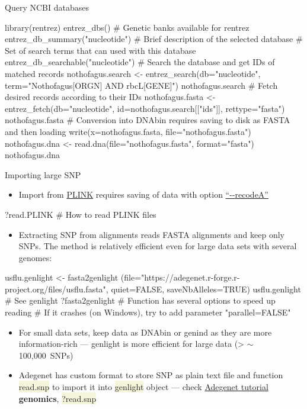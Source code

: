 \documentclass[compress, xelatex, 11pt, xcolor=svgnames, aspectratio=169, url={hyphens, lowtilde}]{beamer}
\renewcommand{\texttt}[1]{\colorbox{Beige}{{\ttfamily #1}}}
\begin{document}
\begin{frame}[fragile]{Query NCBI databases}
	\begin{spluscode}
    library(rentrez)
    entrez_dbs() # Genetic banks available for rentrez
    entrez_db_summary("nucleotide") # Brief description of the selected database
    # Set of search terms that can used with this database
    entrez_db_searchable("nucleotide")
    # Search the database and get IDs of matched records
    nothofagus.search <- entrez_search(db="nucleotide",
      term="Nothofagus[ORGN] AND rbcL[GENE]")
    nothofagus.search
    # Fetch desired records according to their IDs
    nothofagus.fasta <- entrez_fetch(db="nucleotide",
      id=nothofagus.search[["ids"]], rettype="fasta")
    nothofagus.fasta
    # Conversion into DNAbin requires saving to disk as FASTA and then loading
    write(x=nothofagus.fasta, file="nothofagus.fasta")
    nothofagus.dna <- read.dna(file="nothofagus.fasta", format="fasta")
    nothofagus.dna
	\end{spluscode}
\end{frame}

\begin{frame}[fragile]{Importing large SNP}
	\begin{itemize}
		\item Import from \href{https://zzz.bwh.harvard.edu/plink/index.shtml}{PLINK} requires saving of data with option \href{https://zzz.bwh.harvard.edu/plink/dataman.shtml}{\enquote{-{-}recodeA}}
	\end{itemize}
	\begin{spluscode}
    ?read.PLINK # How to read PLINK files
	\end{spluscode}
	\begin{itemize}
		\item Extracting SNP from alignments reads FASTA alignments and keep only SNPs. The method is relatively efficient even for large data sets with several genomes:
	\end{itemize}
	\begin{spluscode}
    usflu.genlight <- fasta2genlight
      (file="https://adegenet.r-forge.r-project.org/files/usflu.fasta",
      quiet=FALSE, saveNbAlleles=TRUE)
    usflu.genlight # See genlight
    ?fasta2genlight # Function has several options to speed up reading
    # If it crashes (on Windows), try to add parameter "parallel=FALSE"
	\end{spluscode}
	\begin{itemize}
		\item For small data sets, keep data as DNAbin or genind as they are more information-rich --- genlight is more efficient for large data (> $\sim$100,000~SNPs)
		\item Adegenet has custom format to store SNP as plain text file and function \texttt{read.snp} to import it into \texttt{genlight} object --- check \href{https://github.com/thibautjombart/adegenet/wiki/Tutorials}{Adegenet tutorial} \textbf{genomics}, \texttt{?read.snp}
	\end{itemize}
\end{frame}
\end{document}
